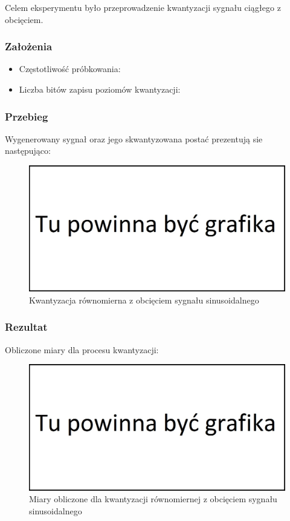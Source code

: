 \documentclass[12pt]{article}
\begin{document}
Celem eksperymentu było przeprowadzenie kwantyzacji sygnału ciągłego z obcięciem.

\subsubsection{Założenia}

\begin{itemize}
    \item Częstotliwość próbkowania:
    \item Liczba bitów zapisu poziomów kwantyzacji:
\end{itemize}
\subsubsection{Przebieg}
Wygenerowany sygnał oraz jego skwantyzowana postać prezentują sie następująco:
\begin{figure}[H]
    \centering
	\includegraphics[width=\linewidth]{tmp.jpg}
    \caption{Kwantyzacja równomierna z obcięciem sygnału sinusoidalnego}
    \label{wykres dla eksperymentu 1}
\end{figure}

\subsubsection{Rezultat}
Obliczone miary dla procesu kwantyzacji:
\begin{figure}[H]
    \centering
	\includegraphics[width=\linewidth]{tmp.jpg}
    \caption{Miary obliczone dla kwantyzacji równomiernej z obcięciem sygnału sinusoidalnego}
    \label{Wartości dla eksperymentu 1}
\end{figure}
\end{document}
